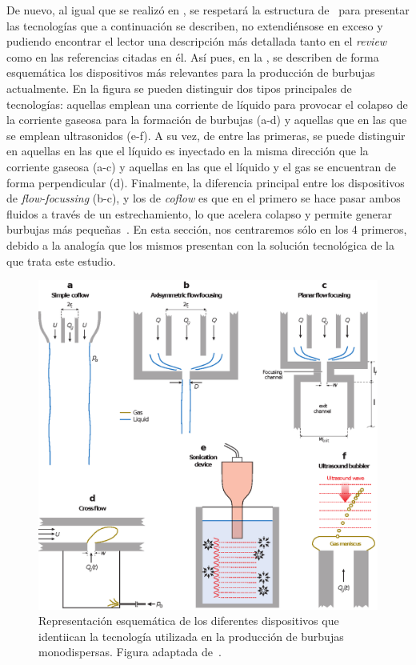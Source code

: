 De nuevo, al igual que se realizó en , se respetará la estructura de~\cite{Rodriguez-Rodriguez2015b} para presentar las tecnologías que a continuación se describen, no extendiénsose en exceso y pudiendo encontrar el lector una descripción más detallada tanto en el \textit{review} como en las referencias citadas en él. Así pues, en la , se describen de forma esquemática los dispositivos más relevantes para la producción de burbujas actualmente. En la figura se pueden distinguir dos tipos principales de tecnologías: aquellas emplean una corriente de líquido para provocar el colapso de la corriente gaseosa para la formación de burbujas (a-d) y aquellas que en las que se emplean ultrasonidos (e-f). A su vez, de entre las primeras, se puede distinguir en aquellas en las que el líquido es inyectado en la misma dirección que la corriente gaseosa (a-c) y aquellas en las que el líquido y el gas se encuentran de forma perpendicular (d). Finalmente, la diferencia principal entre los dispositivos de \emph{flow-focussing} (b-c), y los de \emph{coflow} es que en el primero se hace pasar ambos fluidos a través de un estrechamiento, lo que acelera colapso y permite generar burbujas más pequeñas~\cite{Rodriguez-Rodriguez2015b}. En esta sección, nos centraremos sólo en los 4 primeros, debido a la analogía que los mismos presentan con la solución tecnológica de la que trata este estudio. 


\begin{figure}
\includegraphics[scale=1]{introduccion/figuras/tecnologias.eps}
\caption{Representación esquemática de los diferentes dispositivos que identiican la tecnología utilizada en la producción de burbujas monodispersas. Figura adaptada de~\cite{Rodriguez-Rodriguez2015b}.}
\end{figure}

